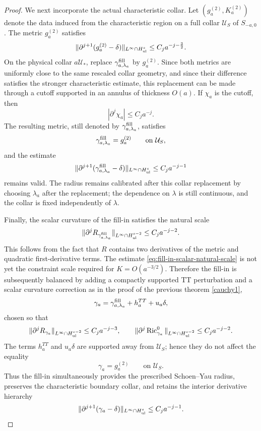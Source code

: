\documentclass{amsart}
\begin{document}
{\begin{proof}
\noindent We next incorporate the actual characteristic collar. Let
\((g_a^{(2)},K_a^{(2)})\) denote the data induced from the characteristic
region on a full collar \(\mathcal U_S\) of \(S_{-a,0}\). The metric
\(g_a^{(2)}\) satisfies
\[
        \|\partial^{j+1}(g_a^{(2)}-\delta)\|_{L^\infty\cap H^s_{\rm ul}}
        \le C_j a^{-j-\frac32}.
\]
On the physical collar \(a\mathcal U_*\), replace
\(\gamma^{\rm fill}_{a,\lambda_a}\) by \(g_a^{(2)}\). Since both metrics
are uniformly close to the same rescaled collar geometry, and since
their difference satisfies the stronger characteristic estimate, this
replacement can be made through a cutoff supported in an annulus of
thickness \(O(a)\). If \(\chi_a\) is the cutoff, then
\[
        |\partial^j\chi_a|\le C_j a^{-j}.
\]
The resulting metric, still denoted by
\(\gamma^{\rm fill}_{a,\lambda_a}\), satisfies
\begin{equation}
\label{eq:fill-in-equals-characteristic-collar}
        \gamma^{\rm fill}_{a,\lambda_a}
        =
        g_a^{(2)}
        \qquad\text{on }\mathcal U_S,
\end{equation}
and the estimate
\[
        \|\partial^{j+1}
        (\gamma^{\rm fill}_{a,\lambda_a}-\delta)\|_{L^\infty\cap H^s_{\rm ul}}
        \le C_j a^{-j-1}
\]
remains valid. The radius remains calibrated after this collar
replacement by choosing \(\lambda_a\) after the replacement; the
dependence on \(\lambda\) is still continuous, and the collar is fixed
independently of \(\lambda\).

\noindent Finally, the scalar curvature of the fill-in satisfies the natural
scale
\begin{equation}
\label{eq:fill-in-scalar-natural-scale}
        \|\partial^jR_{\gamma^{\rm fill}_{a,\lambda_a}}\|_{L^\infty\cap H^{s-2}_{\rm ul}}
        \le C_j a^{-j-2}.
\end{equation}
This follows from the fact that \(R\) contains two derivatives of the
metric and quadratic first-derivative terms. The estimate
\eqref{eq:fill-in-scalar-natural-scale} is not yet the constraint scale
required for \(K=O(a^{-3/2})\). Therefore the fill-in is subsequently
balanced by adding a compactly supported TT perturbation and a scalar
curvature correction as in the proof of the previous theorem \ref{cauchy1},
\[
        \gamma_a
        =
        \gamma^{\rm fill}_{a,\lambda_a}
        +
        h_a^{TT}
        +
        u_a\delta,
\]
chosen so that
\[
        \|\partial^jR_{\gamma_a}\|_{L^\infty\cap H^{s-2}_{\rm ul}}
        \le C_j a^{-j-3},
        \qquad
        \|\partial^j\operatorname{Ric}^0_{\gamma_a}\|_{L^\infty\cap H^{s-2}_{\rm ul}}
        \le C_j a^{-j-2}.
\]
The terms \(h_a^{TT}\) and \(u_a\delta\) are supported away from
\(\mathcal U_S\); hence they do not affect the equality
\[
        \gamma_a=g_a^{(2)}
        \qquad\text{on }\mathcal U_S.
\]
Thus the fill-in simultaneously provides the prescribed
Schoen--Yau radius, preserves the characteristic boundary collar, and
retains the interior derivative hierarchy
\[
        \|\partial^{j+1}(\gamma_a-\delta)\|_{L^\infty\cap H^s_{\rm ul}}
        \le C_j a^{-j-1}.
\]
\end{proof}


}
\end{document}
